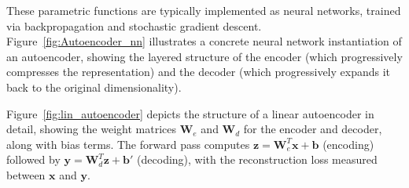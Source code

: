 These parametric functions are typically implemented as neural networks, trained via backpropagation and stochastic gradient descent. Figure~\ref{fig:Autoencoder_nn} illustrates a concrete neural network instantiation of an autoencoder, showing the layered structure of the encoder (which progressively compresses the representation) and the decoder (which progressively expands it back to the original dimensionality).

Figure~\ref{fig:lin_autoencoder} depicts the structure of a linear autoencoder in detail, showing the weight matrices $\mathbf{W}_e$ and $\mathbf{W}_d$ for the encoder and decoder, along with bias terms. The forward pass computes $\mathbf{z} = \mathbf{W}_e^T\mathbf{x} + \mathbf{b}$ (encoding) followed by $\mathbf{y} = \mathbf{W}_d^T\mathbf{z} + \mathbf{b}'$ (decoding), with the reconstruction loss measured between $\mathbf{x}$ and $\mathbf{y}$.

